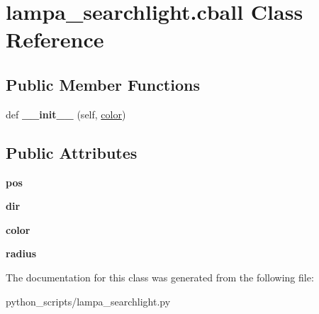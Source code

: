 \hypertarget{classlampa__searchlight_1_1cball}{}\section{lampa\+\_\+searchlight.\+cball Class Reference}
\label{classlampa__searchlight_1_1cball}
\subsection*{Public Member Functions}
\begin{DoxyCompactItemize}
\item 
\hypertarget{classlampa__searchlight_1_1cball_a2528956a998c545b51eb13731afea862}{}def {\bfseries \+\_\+\+\_\+init\+\_\+\+\_\+} (self, \hyperlink{structcolor}{color})\label{classlampa__searchlight_1_1cball_a2528956a998c545b51eb13731afea862}

\end{DoxyCompactItemize}
\subsection*{Public Attributes}
\begin{DoxyCompactItemize}
\item 
\hypertarget{classlampa__searchlight_1_1cball_a3e8093b62dddbe8870a529212b883998}{}{\bfseries pos}\label{classlampa__searchlight_1_1cball_a3e8093b62dddbe8870a529212b883998}

\item 
\hypertarget{classlampa__searchlight_1_1cball_af75f99867f287e260a098a8dc531b326}{}{\bfseries dir}\label{classlampa__searchlight_1_1cball_af75f99867f287e260a098a8dc531b326}

\item 
\hypertarget{classlampa__searchlight_1_1cball_af462f24599212a23ea24755056411c9d}{}{\bfseries color}\label{classlampa__searchlight_1_1cball_af462f24599212a23ea24755056411c9d}

\item 
\hypertarget{classlampa__searchlight_1_1cball_ac788a56d2a2abdc72149844f00b2fa8a}{}{\bfseries radius}\label{classlampa__searchlight_1_1cball_ac788a56d2a2abdc72149844f00b2fa8a}

\end{DoxyCompactItemize}


The documentation for this class was generated from the following file\+:\begin{DoxyCompactItemize}
\item 
python\+\_\+scripts/lampa\+\_\+searchlight.\+py\end{DoxyCompactItemize}
